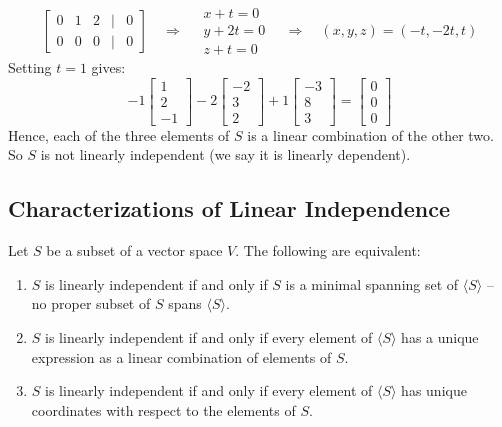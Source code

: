 \documentclass[a4paper, 9pt]{extarticle}
\begin{document}
\begin{examplebox}{}{}
$$\begin{bmatrix}
      0 & 1 & 2 & | & 0 \\
      0 & 0 & 0 & | & 0
    \end{bmatrix}
    \quad\Longrightarrow\quad
    \begin{array}{l}
      x  + t = 0 \\
      y + 2t = 0 \\
      z + t = 0
    \end{array}
    \quad\Longrightarrow\quad
    (x,y,z) = (-t, -2t, t)
  $$
  Setting $t = 1$ gives:
  $$
    -1 \begin{bmatrix}
      1 \\
      2 \\
      -1
    \end{bmatrix}
    -2 \begin{bmatrix}
      -2 \\
      3  \\
      2
    \end{bmatrix}
    +1 \begin{bmatrix}
      -3 \\
      8  \\
      3
    \end{bmatrix}
    =
    \begin{bmatrix}
      0 \\
      0 \\
      0
    \end{bmatrix}
  $$
  Hence, each of the three elements of $S$ is a linear combination of the other two. So $S$ is not linearly independent (we say it is linearly dependent).
\end{examplebox}
\subsection{Characterizations of Linear Independence}

\begin{theorembox}
  Let $S$ be a subset of a vector space $V$. The following are equivalent:
  \begin{enumerate}
    \item $S$ is linearly independent if and only if $S$ is a minimal spanning set of $\langle S \rangle$ -- no proper subset of $S$ spans $\langle S \rangle$.

    \item $S$ is linearly independent if and only if every element of $\langle S \rangle$ has a unique expression as a linear combination of elements of $S$.

    \item $S$ is linearly independent if and only if every element of $\langle S \rangle$ has unique coordinates with respect to the elements of $S$.
  \end{enumerate}
\end{theorembox}
\end{document}
